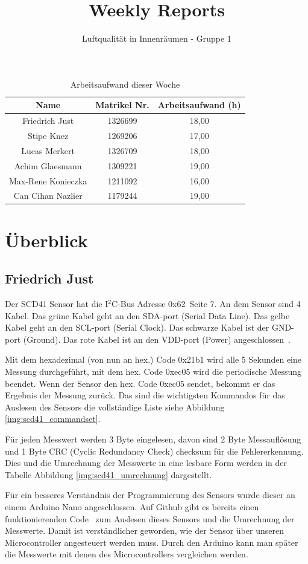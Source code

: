 \documentclass[]{article}
\title{Weekly Reports}
\author{Luftqualität in Innenräumen - Gruppe 1}
\begin{document}
\maketitle

\begin{table}[h!]
	\centering
	\begin{tabular}{|c|c|c|}
		\hline
		{\textbf{Name}}				&		{\textbf{Matrikel Nr.}} & {\textbf{Arbeitsaufwand (h)}} \\
		\hline
		Friedrich Just				&		1326699 				&	18,00	\\
		\hline
		Stipe Knez				&		1269206 				&	17,00	\\
		\hline
		Lucas Merkert				&		1326709					&	18,00	\\
		\hline
		Achim Glaesmann				&		1309221					&	19,00	\\
		\hline
		Max-Rene Konieczka			&		1211092					&	16,00	\\
		\hline
		Can Cihan Nazlier			&		1179244					&	19,00	\\
		\hline
	\end{tabular}
	\caption{Arbeitsaufwand dieser Woche}
	\label{tab:worakload}
\end{table}



\section{Überblick}


\subsection{Friedrich Just}
Der SCD41 Sensor hat die I$^2$C-Bus Adresse 0x62~\cite{datasheetscd41}Seite 7. An dem Sensor sind 4 Kabel. Das grüne Kabel geht an den SDA-port (Serial Data Line). Das gelbe Kabel geht an den SCL-port (Serial Clock). Das schwarze Kabel ist der GND-port (Ground). Das rote Kabel ist an den VDD-port (Power) angeschlossen~\cite{sht21cableconf}.\par Mit dem hexadezimal (von nun an hex.) Code 0x21b1 wird alle 5 Sekunden eine Messung durchgeführt, mit dem hex. Code 0xec05 wird die periodische Messung beendet. Wenn der Sensor den hex. Code 0xec05 sendet, bekommt er das Ergebnis der Messung zurück. Das sind die wichtigsten Kommandos für das Auslesen des Sensors die vollständige Liste siehe {Abbildung \ref{img:scd41_commandset}}.\par Für jeden Messwert werden 3 Byte eingelesen, davon sind 2 Byte Messauflösung und 1 Byte CRC (Cyclic Redundancy Check) checksum für die Fehlererkennung. Dies und die Umrechnung der Messwerte in eine lesbare Form werden in der Tabelle {Abbildung \ref{img:scd41_umrechnung}} dargestellt.\par Für ein besseres Verständnis der Programmierung des Sensors wurde dieser an einem Arduino Nano angeschlossen. Auf Github gibt es bereits einen funktionierenden Code~\cite{scd41github} zum Auslesen dieses Sensors und die Umrechnung der Messwerte. Damit ist verständlicher geworden, wie der Sensor über unseren Microcontroller angesteuert werden muss. Durch den Arduino kann man später die Messwerte mit denen des Microcontrollers vergleichen werden.
\end{document}
